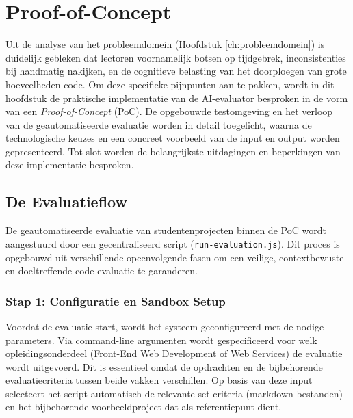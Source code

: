 \chapter{Proof-of-Concept}%
\label{ch:poc}

Uit de analyse van het probleemdomein (Hoofdstuk \ref{ch:probleemdomein}) is duidelijk gebleken dat lectoren voornamelijk botsen op tijdgebrek, inconsistenties bij handmatig nakijken, en de cognitieve belasting van het doorploegen van grote hoeveelheden code. Om deze specifieke pijnpunten aan te pakken, wordt in dit hoofdstuk de praktische implementatie van de AI-evaluator besproken in de vorm van een \textit{Proof-of-Concept} (PoC). De opgebouwde testomgeving en het verloop van de geautomatiseerde evaluatie worden in detail toegelicht, waarna de technologische keuzes en een concreet voorbeeld van de input en output worden gepresenteerd. Tot slot worden de belangrijkste uitdagingen en beperkingen van deze implementatie besproken.

\section{De Evaluatieflow}

De geautomatiseerde evaluatie van studentenprojecten binnen de PoC wordt aangestuurd door een gecentraliseerd script (\texttt{run-evaluation.js}). Dit proces is opgebouwd uit verschillende opeenvolgende fasen om een veilige, contextbewuste en doeltreffende code-evaluatie te garanderen.

\vspace{1em}

\subsection{Stap 1: Configuratie en Sandbox Setup}

Voordat de evaluatie start, wordt het systeem geconfigureerd met de nodige parameters. Via command-line argumenten wordt gespecificeerd voor welk opleidingsonderdeel (Front-End Web Development of Web Services) de evaluatie wordt uitgevoerd. Dit is essentieel omdat de opdrachten en de bijbehorende evaluatiecriteria tussen beide vakken verschillen. Op basis van deze input selecteert het script automatisch de relevante set criteria (markdown-bestanden) en het bijbehorende voorbeeldproject dat als referentiepunt dient.

